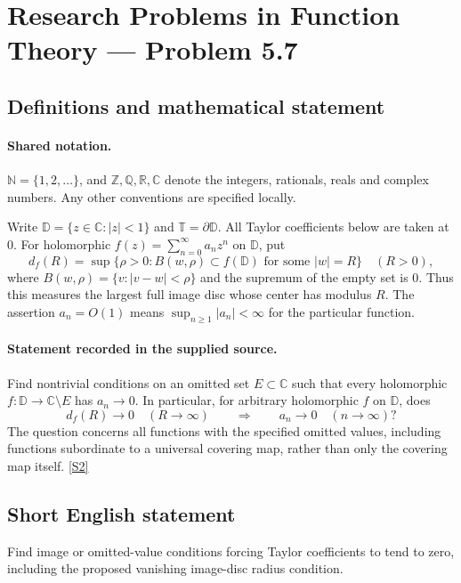 \documentclass[11pt]{article}
\newcommand{\sref}[2]{\hyperlink{source:#1:#2}{[S#2]}}
\begin{document}
\section{Research Problems in Function Theory — Problem 5.7}\label{statement}

\subsection{Definitions and mathematical statement}

\paragraph{Shared notation.}$\mathbb N=\{1,2,\ldots\}$, and $\mathbb Z,\mathbb Q,\mathbb R,\mathbb C$ denote the integers, rationals, reals and complex numbers. Any other conventions are specified locally.


Write $\mathbb D=\{z\in\mathbb C:|z|<1\}$ and $\mathbb T=\partial\mathbb D$. All Taylor coefficients below are taken at $0$. For holomorphic $f(z)=\sum_{n=0}^\infty a_nz^n$ on $\mathbb D$, put
\[d_f(R)=\sup\{\rho>0:B(w,\rho)\subset f(\mathbb D)\text{ for some }|w|=R\}\quad(R>0),\]
where $B(w,\rho)=\{v:|v-w|<\rho\}$ and the supremum of the empty set is $0$. Thus this measures the largest full image disc whose center has modulus $R$. The assertion $a_n=O(1)$ means $\sup_{n\ge1}|a_n|<\infty$ for the particular function.
\paragraph{Statement recorded in the supplied source.}
Find nontrivial conditions on an omitted set $E\subset\mathbb C$ such that every holomorphic $f:\mathbb D\to\mathbb C\setminus E$ has $a_n\to0$. In particular, for arbitrary holomorphic $f$ on $\mathbb D$, does
\[d_f(R)\longrightarrow0\quad(R\to\infty)\qquad\Longrightarrow\qquad a_n\longrightarrow0\quad(n\to\infty)?\]
The question concerns all functions with the specified omitted values, including functions subordinate to a universal covering map, rather than only the covering map itself. \sref{statement}{2}
\subsection{Short English statement}
Find image or omitted-value conditions forcing Taylor coefficients to tend to zero, including the proposed vanishing image-disc radius condition.
\end{document}
